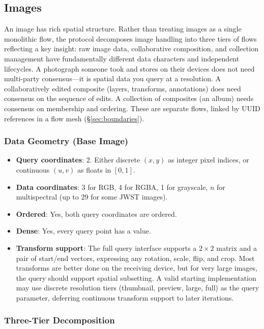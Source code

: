 \documentclass[11pt, letterpaper]{article}
\begin{document}
\subsection{Images}
\label{sec:ex-images}

An image has rich spatial structure. Rather than treating images as a single monolithic
flow, the protocol decomposes image handling into three tiers of flows reflecting a key
insight: raw image data, collaborative composition, and collection management have
fundamentally different data characters and independent lifecycles. A photograph someone
took and stores on their devices does not need multi-party consensus---it is spatial data
you query at a resolution. A collaboratively edited composite (layers, transforms,
annotations) does need consensus on the sequence of edits. A collection of composites
(an album) needs consensus on membership and ordering. These are separate flows, linked
by UUID references in a flow mesh (\S\ref{sec:boundaries}).

\subsubsection{Data Geometry (Base Image)}
\begin{itemize}[leftmargin=2em]
  \item \textbf{Query coordinates}: 2. Either discrete $(x, y)$ as integer pixel
    indices, or continuous $(u, v)$ as floats in $[0, 1]$.
  \item \textbf{Data coordinates}: 3 for RGB, 4 for RGBA, 1 for grayscale, $n$ for
    multispectral (up to 29 for some JWST images).
  \item \textbf{Ordered}: Yes, both query coordinates are ordered.
  \item \textbf{Dense}: Yes, every query point has a value.
  \item \textbf{Transform support}: The full query interface supports a $2 \times 2$
    matrix and a pair of start/end vectors, expressing any rotation, scale, flip, and
    crop. Most transforms are better done on the receiving device, but for very large
    images, the query should support spatial subsetting. A valid starting implementation
    may use discrete resolution tiers (thumbnail, preview, large, full) as the query
    parameter, deferring continuous transform support to later iterations.
\end{itemize}

\subsubsection{Three-Tier Decomposition}
\end{document}
